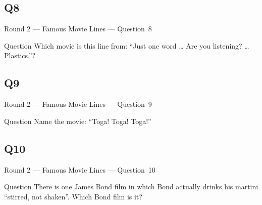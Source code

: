 \documentclass[11pt]{beamer}
\begin{document}
\subsection*{Q8}
\begin{frame}[t]{Round 2 --- Famous Movie Lines --- \mbox{Question 8}}
\vspace{-0.5em}
\begin{block}{Question}
Which movie is this line from: ``Just one word \ldots{} Are you listening? \ldots{} Plastics.''?
\end{block}
\end{frame}
\subsection*{Q9}
\begin{frame}[t]{Round 2 --- Famous Movie Lines --- \mbox{Question 9}}
\vspace{-0.5em}
\begin{block}{Question}
Name the movie: ``Toga! Toga! Toga!''
\end{block}
\end{frame}
\subsection*{Q10}
\begin{frame}[t]{Round 2 --- Famous Movie Lines --- \mbox{Question 10}}
\vspace{-0.5em}
\begin{block}{Question}
There is one James Bond film in which Bond actually drinks his martini ``stirred, not shaken''. Which Bond film is it?
\end{block}
\end{frame}
\end{document}
